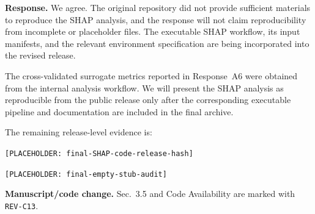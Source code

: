 \documentclass[11pt,a4paper]{article}
\begin{document}
\noindent\textbf{Response.}
We agree. The original repository did not provide sufficient materials to reproduce the SHAP analysis, and the response will not claim reproducibility from incomplete or placeholder files. The executable SHAP workflow, its input manifests, and the relevant environment specification are being incorporated into the revised release.

The cross-validated surrogate metrics reported in Response~A6 were obtained from the internal analysis workflow. We will present the SHAP analysis as reproducible from the public release only after the corresponding executable pipeline and documentation are included in the final archive.

The remaining release-level evidence is:

\begin{center}
\texttt{[PLACEHOLDER: final-SHAP-code-release-hash]}
\end{center}

\begin{center}
\texttt{[PLACEHOLDER: final-empty-stub-audit]}
\end{center}

\noindent\textbf{Manuscript/code change.}
Sec.~3.5 and Code Availability are marked with \texttt{REV-C13}.



\end{document}
